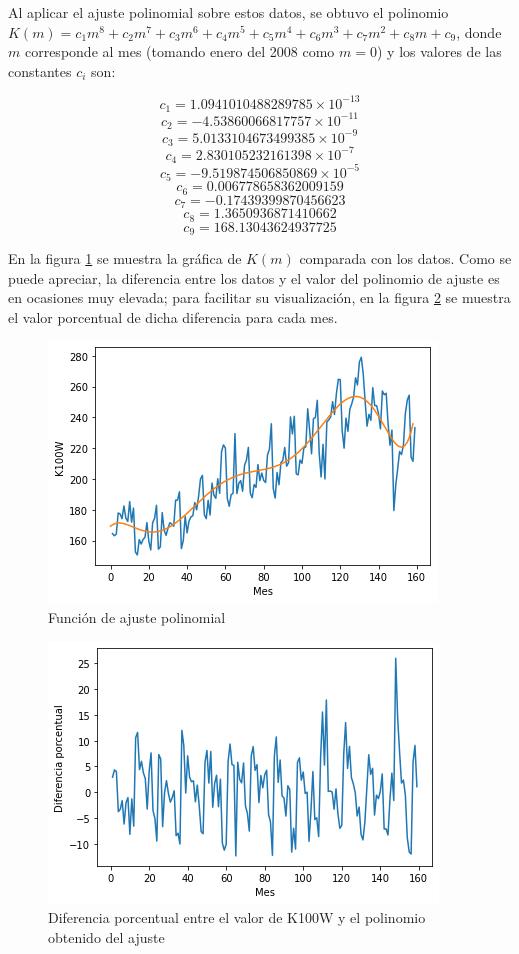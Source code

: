 \documentclass[twocolumn]{article}
\begin{document}
Al aplicar el ajuste polinomial sobre estos datos, se obtuvo el polinomio $K(m)=c_1m^8+c_2m^7+c_3m^6+c_4m^5+c_5m^4+c_6m^3+c_7m^2+c_8m+c_9$, donde $m$ corresponde al mes (tomando enero del 2008 como $m=0$) y los valores de las constantes $c_i$ son:

$$c_1=1.0941010488289785\times10^{-13}$$
$$c_2=-4.53860066817757\times10^{-11}$$
$$c_3=5.0133104673499385\times10^{-9}$$
$$c_4=2.830105232161398\times10^{-7}$$
$$c_5=-9.519874506850869\times10^{-5}$$
$$c_6=0.006778658362009159$$
$$c_7=-0.17439399870456623$$
$$c_8=1.3650936871410662$$
$$c_9=168.13043624937725$$

\medskip

En la figura \ref{fig:2} se muestra la gráfica de $K(m)$ comparada con los datos. Como se puede apreciar, la diferencia entre los datos y el valor del polinomio de ajuste es en ocasiones muy elevada; para facilitar su visualización, en la figura \ref{fig:3} se muestra el valor porcentual de dicha diferencia para cada mes.

\begin{figure}[h]
\includegraphics[width=\columnwidth]{fig_2}
\caption{Función de ajuste polinomial}
\label{fig:2}
\end{figure}

\begin{figure}[h]
\includegraphics[width=\columnwidth]{fig_3}
\caption{Diferencia porcentual entre el valor de K100W y el polinomio obtenido del ajuste}
\label{fig:3}
\end{figure}
\end{document}
